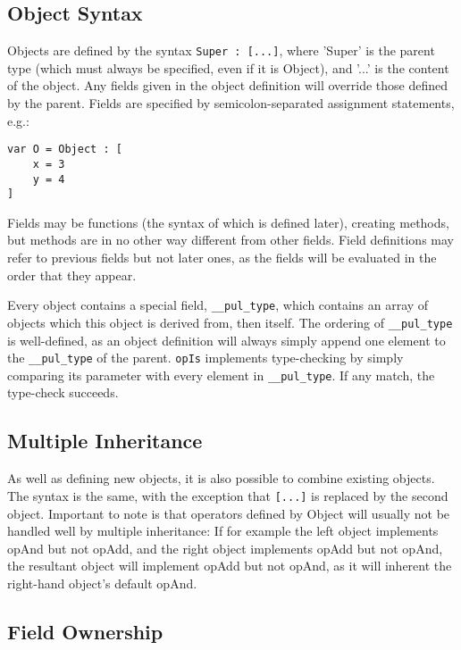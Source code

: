\subsection{Object Syntax}

Objects are defined by the syntax \texttt{Super : [...]}, where 'Super' is the parent type (which must always be specified, even if it is Object), and '...' is the content of the object. Any fields given in the object definition will override those defined by the parent. Fields are specified by semicolon-separated assignment statements, e.g.:

\begin{verbatim}
var O = Object : [
    x = 3
    y = 4
]
\end{verbatim}



Fields may be functions (the syntax of which is defined later), creating methods, but methods are in no other way different from other fields. Field definitions may refer to previous fields but not later ones, as the fields will be evaluated in the order that they appear.

Every object contains a special field, \texttt{\_\_pul\_type}, which contains an array of objects which this object is derived from, then itself. The ordering of \texttt{\_\_pul\_type} is well-defined, as an object definition will always simply append one element to the \texttt{\_\_pul\_type} of the parent. \texttt{opIs} implements type-checking by simply comparing its parameter with every element in \texttt{\_\_pul\_type}. If any match, the type-check succeeds.



\subsection{Multiple Inheritance}

As well as defining new objects, it is also possible to combine existing objects. The syntax is the same, with the exception that \texttt{[...]} is replaced by the second object. Important to note is that operators defined by Object will usually not be handled well by multiple inheritance: If for example the left object implements opAnd but not opAdd, and the right object implements opAdd but not opAnd, the resultant object will implement opAdd but not opAnd, as it will inherent the right-hand object's default opAnd.



\subsection{Field Ownership}

